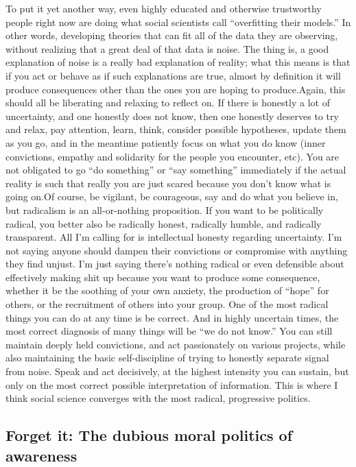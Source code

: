 \documentclass[a4paper,12pt,margin=.5in]{article}
\begin{document}
To put it yet another way, even highly educated and otherwise
trustworthy people right now are doing what social scientists call
``overfitting their models.'' In other words, developing theories that
can fit all of the data they are observing, without realizing that a
great deal of that data is noise. The thing is, a good explanation of
noise is a really bad explanation of reality; what this means is that if
you act or behave as if such explanations are true, almost by definition
it will produce consequences other than the ones you are hoping to
produce.Again, this should all be liberating and relaxing to reflect on.
If there is honestly a lot of uncertainty, and one honestly does not
know, then one honestly deserves to try and relax, pay attention, learn,
think, consider possible hypotheses, update them as you go, and in the
meantime patiently focus on what you do know (inner convictions, empathy
and solidarity for the people you encounter, etc). You are not obligated
to go ``do something'' or ``say something'' immediately if the actual
reality is such that really you are just scared because you don't know
what is going on.Of course, be vigilant, be courageous, say and do what
you believe in, but radicalism is an all-or-nothing proposition. If you
want to be politically radical, you better also be radically honest,
radically humble, and radically transparent. All I'm calling for is
intellectual honesty regarding uncertainty. I'm not saying anyone should
dampen their convictions or compromise with anything they find unjust.
I'm just saying there's nothing radical or even defensible about
effectively making shit up because you want to produce some consequence,
whether it be the soothing of your own anxiety, the production of
``hope'' for others, or the recruitment of others into your group. One
of the most radical things you can do at any time is be correct. And in
highly uncertain times, the most correct diagnosis of many things will
be ``we do not know.'' You can still maintain deeply held convictions,
and act passionately on various projects, while also maintaining the
basic self-discipline of trying to honestly separate signal from noise.
Speak and act decisively, at the highest intensity you can sustain, but
only on the most correct possible interpretation of information. This is
where I think social science converges with the most radical,
progressive politics.

\subsection{Forget it: The dubious moral politics of
awareness}\label{forget-it-the-dubious-moral-politics-of-awareness}
\end{document}
